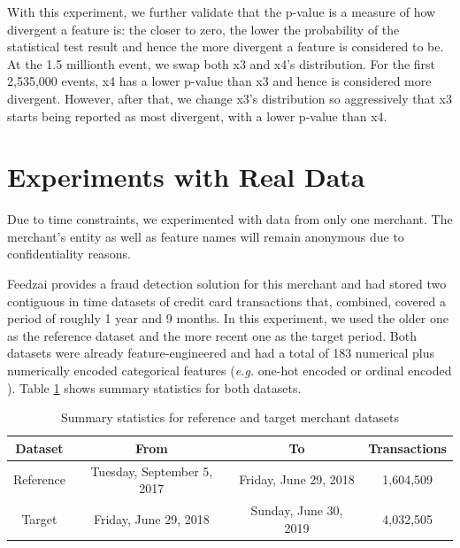 With this experiment, we further validate that the p-value is a measure of how divergent a feature is: the closer to zero, the lower the probability of the statistical test result and hence the more divergent a feature is considered to be. At the 1.5 millionth event, we swap both x3 and x4's distribution. For the first 2,535,000 events, x4 has a lower p-value than x3 and hence is considered more divergent. However, after that, we change x3's distribution so aggressively that x3 starts being reported as most divergent, with a lower p-value than x4.

\clearpage
\section{Experiments with Real Data}

Due to time constraints, we experimented with data from only one merchant. The merchant's entity as well as feature names will remain anonymous due to confidentiality reasons.

Feedzai provides a fraud detection solution for this merchant and had stored two contiguous in time datasets of credit card transactions that, combined, covered a period of roughly 1 year and 9 months. In this experiment, we used the older one as the reference dataset and the more recent one as the target period. Both datasets were already feature-engineered \cite{Domingos-ML-Feat-Eng} and had a total of 183 numerical plus numerically encoded categorical features (\textit{e.g.} one-hot encoded or ordinal encoded \cite{categoricalencoding}). Table \ref{tbl:merchant1-datasets-summary} shows summary statistics for both datasets.
\begin{table}[!htb]
    \begin{center}
        \begin{tabular}{|c|c|c|c|}
        \hline
        \textbf{Dataset} & \textbf{From}              & \textbf{To}           & \multicolumn{1}{l|}{\textbf{Transactions}} \\ \hline
        Reference        & Tuesday, September 5, 2017 & Friday, June 29, 2018 & 1,604,509                                  \\ \hline
        Target           & Friday, June 29, 2018      & Sunday, June 30, 2019 & 4,032,505                                  \\ \hline
        \end{tabular}
        \caption{Summary statistics for reference and target merchant datasets}
        \label{tbl:merchant1-datasets-summary}
    \end{center}
\end{table}

